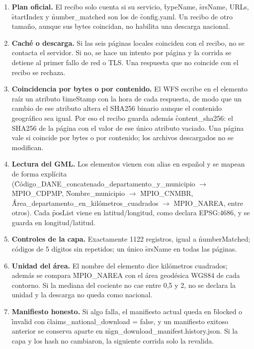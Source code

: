 \begin{enumerate}
  \item \textbf{Plan oficial.} El recibo solo cuenta si su servicio, \f{typeName}, \f{srsName}, URLs, \f{startIndex} y \f{number\_matched} son los de \f{config.yaml}. Un recibo de otro tamaño, aunque sus bytes coincidan, no habilita una descarga nacional.
  \item \textbf{Caché o descarga.} Si las seis páginas locales coinciden con el recibo, no se contacta el servidor. Si no, se hace un intento por página y la corrida se detiene al primer fallo de red o TLS. Una respuesta que no coincide con el recibo se rechaza.
  \item \textbf{Coincidencia por bytes o por contenido.} El WFS escribe en el elemento raíz un atributo \f{timeStamp} con la hora de cada respuesta, de modo que un cambio de ese atributo altera el SHA256 binario aunque el contenido geográfico sea igual. Por eso el recibo guarda además \f{content\_sha256}: el SHA256 de la página con el valor de ese único atributo vaciado. Una página vale si coincide por bytes o por contenido; los archivos descargados no se modifican.
  \item \textbf{Lectura del GML.} Los elementos vienen con alias en español y se mapean de forma explícita (\f{Código\_DANE\_concatenado\_departamento\_y\_municipio} $\rightarrow$ \f{MPIO\_CDPMP}, \f{Nombre\_municipio} $\rightarrow$ \f{MPIO\_CNMBR}, \f{Área\_departamento\_en\_kilómetros\_cuadrados} $\rightarrow$ \f{MPIO\_NAREA}, entre otros). Cada \f{posList} viene en latitud/longitud, como declara EPSG:4686, y se guarda en longitud/latitud.
  \item \textbf{Controles de la capa.} Exactamente 1122 registros, igual a \f{numberMatched}; códigos de 5 dígitos sin repetidos; un único \f{srsName} en todas las páginas.
  \item \textbf{Unidad del área.} El nombre del elemento dice kilómetros cuadrados; además se compara \f{MPIO\_NAREA} con el área geodésica WGS84 de cada contorno. Si la mediana del cociente no cae entre 0,5 y 2, no se declara la unidad y la descarga no queda como nacional.
  \item \textbf{Manifiesto honesto.} Si algo falla, el manifiesto actual queda en \f{blocked} o \f{invalid} con \f{claims\_national\_download = false}, y un manifiesto exitoso anterior se conserva aparte en \f{mgn\_download\_manifest.history.json}. Si la capa y los hash no cambiaron, la siguiente corrida solo la revalida.
\end{enumerate}


